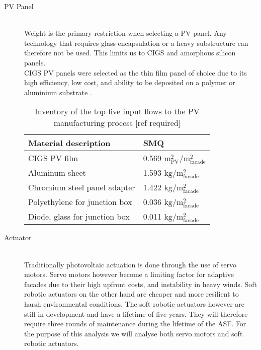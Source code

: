 \begin{description}

\item[PV Panel] \hfill\\
Weight is the primary restriction when selecting a PV panel. Any technology that requires glass encapsulation or a heavy substructure can therefore not be used. This limits us to CIGS and amorphous silicon panels.\\

CIGS PV panels were selected as the thin film panel of choice due to its high efficiency, low cost, and ability to be deposited on a polymer or aluminium substrate \cite{chirilua2011highly}. 




\begin{table}[H]
\centering
\begin{tabular}{ll}
\hline
Material description & SMQ \\ \hline
CIGS PV film       	 & 0.569 ${\mathrm{m^2_{PV}/m^2_{facade}}}$\\
Aluminum sheet 	 & 1.593 ${\mathrm{kg/m^2_{facade}}}$\\
Chromium steel panel adapter  & 1.422 ${\mathrm{kg/m^2_{facade}}}$\\
Polyethylene for junction box & 0.036 ${\mathrm{kg/m^2_{facade}}}$\\
Diode, glass for junction box & 0.011 ${\mathrm{kg/m^2_{facade}}}$\\
\hline
\end{tabular}
\caption{Inventory of the top five input flows to the PV manufacturing process [ref required]}
\label{tab:PVinv}
\end{table}

\item[Actuator] \hfill \\
Traditionally photovoltaic actuation is done through the use of servo motors. Servo motors however become a limiting factor for adaptive facades due to their high upfront costs, and instability in heavy winds. Soft robotic actuators on the other hand are cheaper and more resilient to harsh environmental conditions\cite{Svetozarevic2014a}. The soft robotic actuators however are still in development and have a lifetime of five years. They will therefore require three rounds of maintenance during the lifetime of the ASF.
For the purpose of this analysis we will analyse both servo motors and soft robotic actuators. 


\end{description}
